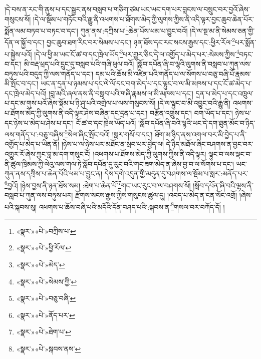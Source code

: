 །དེ་བས་ན་རང་གི་ནུས་པ་དང་སྦྱར་ནས་བསླབ་པ་གཅིག་ཙམ་ཡང་ཡང་དག་པར་བླངས་ལ་བསྲུང་བར་བྱའོ་ཞེས་གསུངས་སོ། །དེ་ལ་སྡོམ་པ་གཏོང་བའི་རྒྱུ་ནི་འཕགས་པ་ཐོགས་མེད་ཀྱི་ལུགས་ཀྱིས་ནི་འདི་ལྟར་བྱང་ཆུབ་ཆེན་པོར་སྨོན་ལམ་བཏབ་པ་བཏང་བ་དང་། ཀུན་ནས་:དཀྲིས་པ་\footnote{«སྣར་»«པེ་»བཀྲིས་པ་}ཆེན་པོས་ཕམ་པ་བྱུང་བའོ། །དེ་ལ་སྔ་མ་ནི་སེམས་ཅན་གྱི་དོན་ལ་སྐྱོ་བ་དང་། བྱང་ཆུབ་ཐག་རིང་བར་སེམས་པ་དང་། ཉན་ཐོས་དང་རང་སངས་རྒྱས་དང་:ཕྱིར་རོལ་\footnote{«སྣར་»«པེ་»ཕྱི་རོལ་}པར་སྨོན་པ་སྐྱེས་པའོ། །དེ་ལ་ཕྱི་མ་ཡང་ངོ་ཚ་བ་དང་ཁྲེལ་ཡོད་\footnote{«སྣར་»«པེ་»མེད་}པར་གྱུར་ཅིང་དེ་ལ་འགྱོད་པ་མེད་པར་:སེམས་ཀྱིས་\footnote{«སྣར་»«པེ་»སེམས་ཀྱི་}བཏང་བ་དང་། མི་བརྡ་ཕྲད་པའི་དྲུང་དུ་བསླབ་པའི་གཞི་ཕུལ་བའོ། །སློབ་དཔོན་ཞི་བ་ལྷའི་ལུགས་ནི་བསླབ་པ་ཀུན་ལས་བཏུས་པའི་བདུད་ཀྱི་ལས་གནོད་པ་དང་། དམ་པའི་ཆོས་མི་འཛིན་པའི་གནོད་པ་ལ་སོགས་པ་བཅུ་བཞི་པོ་རྣམས་མི་སྤོང་བ་དང་། ཡང་ན་དྲན་པ་ཉམས་པ་དང་ལེ་ལོ་དང་བག་མེད་པ་དང་ལྟུང་བ་ལ་མི་མཁས་པ་དང་ངོ་ཚ་མེད་པ་དང་ཁྲེལ་མེད་པའོ། །བླ་མའི་ཞལ་ནས་ནི་བསླབ་པའི་གཞི་རྣམས་ལ་མི་མཁས་པ་དང་། དྲན་པ་མེད་པ་དང་འཁྲུལ་པ་དང་མ་གུས་པའོ་ཞེས་སྡོམ་པ་ཉི་ཤུ་པའི་འགྲེལ་པ་ལས་གསུངས་སོ། །དེ་ལ་ལྟུང་བ་མི་འབྱུང་བའི་རྒྱུ་ནི། འཕགས་པ་ཐོགས་མེད་ཀྱི་ལུགས་ནི་འདི་ལྟར་ཤེས་བཞིན་དང་དྲན་པ་དང་། བརྩོན་འགྲུས་དང་། བག་ཡོད་པ་དང་། ཉེས་པ་དང་ཉེས་པ་མེད་པ་ཤེས་པ་དང་། ངོ་ཚ་བ་དང་ཁྲེལ་ཡོད་པའོ། །སློབ་དཔོན་ཞི་བའི་ལྷའི་ཡང་དེ་དག་ཐུན་མོང་བ་ཉིད་ལས་གནོད་པ་:བཅུ་བཞིས་\footnote{«སྣར་»«པེ་»བཅུ་བཞི་}སེལ་ཞིང་སྤོང་བའོ། །སླར་གསོ་བ་དང་། ཐོག་མ་ཉིད་ནས་འགལ་བར་མི་བྱེད་པ་ནི་འགྱོད་པ་མེད་པ་ཡིན་ནོ། །ཉེས་པ་ལ་ཉེས་པར་མཐོང་ན་སྲབ་པར་བྱེད་ལ། དེ་ཉིད་མཐོལ་ཞིང་བཤགས་ན་བྱང་བར་འགྱུར་རོ་ཞེས་ཀྱང་བླ་མ་དག་གསུང་ངོ། །འཕགས་པ་ཐོགས་མེད་ཀྱི་ལུགས་ཀྱིས་ནི་འདི་ལྟར། ལྟུང་བ་ལས་ལྡང་བ་ནི་ཚུལ་ཁྲིམས་ཀྱི་ལེའུ་ལས་གལ་ཏེ་སློབ་དཔོན་དུ་རུང་བའི་གང་ཟག་མེད་ན་ཞེས་བྱ་བ་ལ་སོགས་པ་དང་། ཡང་ཀུན་ནས་དཀྲིས་པ་ཆེན་པོའི་ཕམ་པ་བྱུང་ན། དེས་དགེ་འདུན་གྱི་མདུན་དུ་བཤགས་ལ་སྡོམ་པ་སླར་:མནོད་པར་\footnote{«སྣར་»«པེ་»ནོད་པར་}བྱའོ། །ཉེས་བྱས་ནི་ཉན་ཐོས་སམ། :ཐེག་པ་ཆེན་པོ་\footnote{«སྣར་»«པེ་»ཐེག་པ་}གང་ཡང་རུང་བ་ལ་བཤགས་སོ། །སློབ་དཔོན་ཞི་བའི་ལྷས་ནི་བསླབ་པ་ཀུན་ལས་བཏུས་པར། རྫོགས་སངས་རྒྱས་ཀྱིས་གསུངས་ཚུལ་དུ། །འབད་པ་མེད་ན་ངན་སོང་འགྲོ། །ཞེས་པའི་སྐབས་སུ། འཕགས་པ་ཆོས་བཞི་པའི་མདོའི་དོན་བཤད་པའི་:སྐབས་ན་\footnote{«སྣར་»«པེ་»སྐབས་ནས་}གསལ་བར་བཀོད་དོ། །
